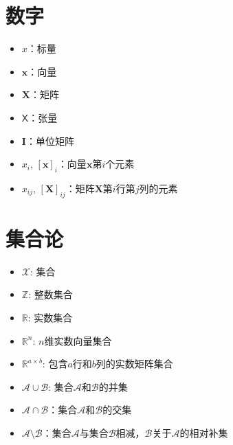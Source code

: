 \documentclass[letterpaper,10pt,english]{sphinxmanual}
\begin{document}
\section{数字}
\label{\detokenize{chapter_notation/index:id2}}\begin{itemize}
\item {} 
\sphinxAtStartPar
\(x\)：标量

\item {} 
\sphinxAtStartPar
\(\mathbf{x}\)：向量

\item {} 
\sphinxAtStartPar
\(\mathbf{X}\)：矩阵

\item {} 
\sphinxAtStartPar
\(\mathsf{X}\)：张量

\item {} 
\sphinxAtStartPar
\(\mathbf{I}\)：单位矩阵

\item {} 
\sphinxAtStartPar
\(x_i\),
\([\mathbf{x}]_i\)：向量\(\mathbf{x}\)第\(i\)个元素

\item {} 
\sphinxAtStartPar
\(x_{ij}\),
\([\mathbf{X}]_{ij}\)：矩阵\(\mathbf{X}\)第\(i\)行第\(j\)列的元素

\end{itemize}


\section{集合论}
\label{\detokenize{chapter_notation/index:id3}}\begin{itemize}
\item {} 
\sphinxAtStartPar
\(\mathcal{X}\): 集合

\item {} 
\sphinxAtStartPar
\(\mathbb{Z}\): 整数集合

\item {} 
\sphinxAtStartPar
\(\mathbb{R}\): 实数集合

\item {} 
\sphinxAtStartPar
\(\mathbb{R}^n\): \(n\)维实数向量集合

\item {} 
\sphinxAtStartPar
\(\mathbb{R}^{a\times b}\):
包含\(a\)行和\(b\)列的实数矩阵集合

\item {} 
\sphinxAtStartPar
\(\mathcal{A}\cup\mathcal{B}\):
集合\(\mathcal{A}\)和\(\mathcal{B}\)的并集

\item {} 
\sphinxAtStartPar
\(\mathcal{A}\cap\mathcal{B}\)：集合\(\mathcal{A}\)和\(\mathcal{B}\)的交集

\item {} 
\sphinxAtStartPar
\(\mathcal{A}\setminus\mathcal{B}\)：集合\(\mathcal{A}\)与集合\(\mathcal{B}\)相减，\(\mathcal{B}\)关于\(\mathcal{A}\)的相对补集

\end{itemize}
\end{document}
